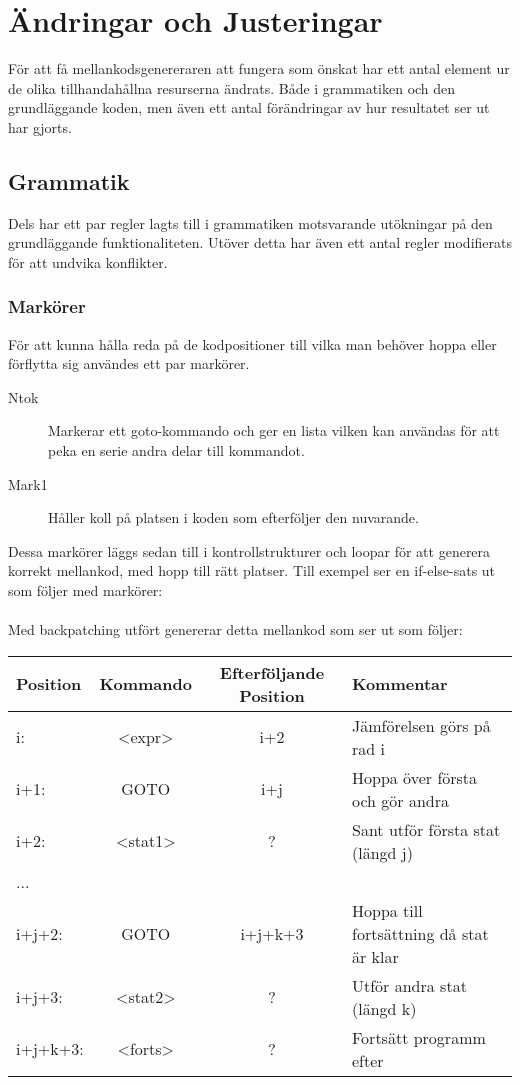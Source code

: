 

\section{Ändringar och Justeringar}
	För att få mellankodsgenereraren att fungera som önskat har ett antal 
	element ur de olika tillhandahållna resurserna ändrats. Både i grammatiken
	och den grundläggande koden, men även ett antal förändringar av hur
	resultatet ser ut har gjorts.

	\subsection{Grammatik}
		Dels har ett par regler lagts till i grammatiken motsvarande utökningar
		på den grundläggande funktionaliteten. Utöver detta har även ett antal regler 
		modifierats för att undvika konflikter.

		\subsubsection{Markörer}
			För att kunna hålla reda på de kodpositioner till vilka man behöver hoppa eller
			förflytta sig användes ett par markörer.\\

			\begin{description}
				\item[Ntok]	 Markerar ett goto-kommando och ger en lista vilken kan användas för att peka en serie andra delar till kommandot.
				\item[Mark1] Håller koll på platsen i koden som efterföljer den nuvarande.
			\end{description}

			Dessa markörer läggs sedan till i kontrollstrukturer och loopar för att generera korrekt mellankod, med hopp till rätt platser. Till exempel ser en if-else-sats ut som följer med markörer: \\
\\
			Med backpatching utfört genererar detta mellankod som ser ut som följer:\\
\begin{table}[h!]
	\begin{tabular}{ l | c | c | l }
\textbf{Position} & \textbf{Kommando} & \textbf{Efterföljande Position} & \textbf{Kommentar} \\ \hline
i:  &     <expr>   &  i+2 & Jämförelsen görs på rad i \\
i+1:   &  GOTO    &   i+j &      Hoppa över första och gör andra \\
i+2:   &  <stat1>  &  ? 	&     Sant utför första stat (längd j) \\
... &&&\\
i+j+2:  & GOTO    &   i+j+k+3  & Hoppa till fortsättning då stat är klar \\
i+j+3:  & <stat2>  &  ?      &   Utför andra stat (längd k) \\
i+j+k+3:& <forts>  &  ?      &   Fortsätt programm efter \\
	\end{tabular}
\end{table}
		

